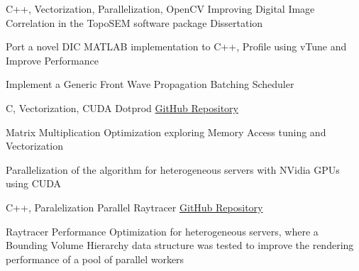 
\begin{cventries}


\cventry
{C++, Vectorization, Parallelization, OpenCV} %
{Improving Digital Image Correlation in the TopoSEM software package} %
{Dissertation} %
{} %
{ %
\begin{cvitems}
\item {Port a novel DIC MATLAB implementation to C++, Profile using vTune and Improve Performance}
\item {Implement a Generic Front Wave Propagation Batching Scheduler}
\end{cvitems}
}


\cventry
{C, Vectorization, CUDA} %
  {Dotprod} %
{\href{https://github.com/JoseFilipeFerreira/dotprod}{GitHub Repository}} %
{} %
{ %
\begin{cvitems}
\item {Matrix Multiplication Optimization exploring Memory Access tuning and Vectorization}
\item {Parallelization of the algorithm for heterogeneous servers with NVidia GPUs using CUDA}
\end{cvitems}
}


\cventry
{C++, Paralelization} %
  {Parallel Raytracer} %
{\href{https://github.com/JoseFilipeFerreira/parallel-raytracer}{GitHub Repository}} %
{} %
{ %
\begin{cvitems}
\item {Raytracer Performance Optimization for heterogeneous servers, where a Bounding Volume Hierarchy data structure was tested to improve the rendering performance of a pool of parallel workers}
\end{cvitems}
}




\end{cventries}
